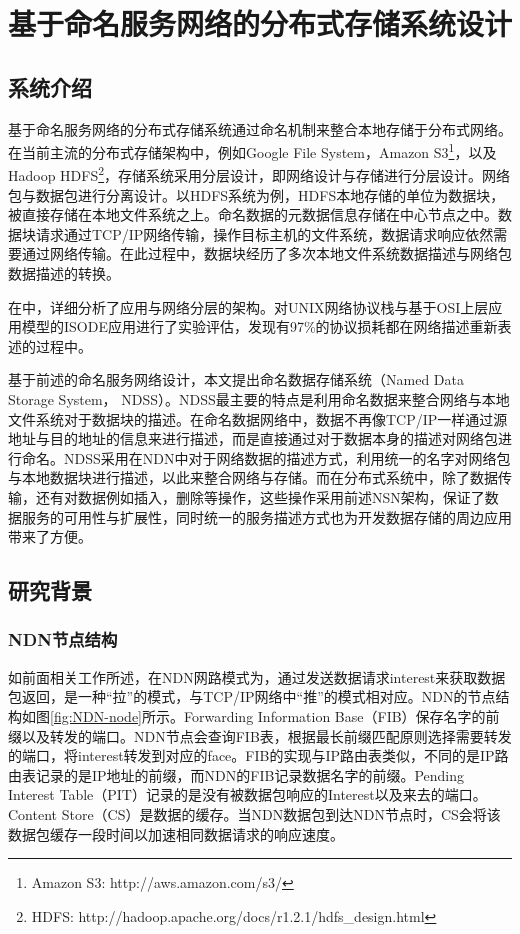 

\chapter{基于命名服务网络的分布式存储系统设计}

\section{系统介绍}
基于命名服务网络的分布式存储系统通过命名机制来整合本地存储于分布式网络。在当前主流的分布式存储架构中，例如Google File System\cite{ghemawat2003google}，Amazon S3\footnote{Amazon S3: http://aws.amazon.com/s3/}，以及Hadoop HDFS\footnote{HDFS: http://hadoop.apache.org/docs/r1.2.1/hdfs\_design.html }，存储系统采用分层设计，即网络设计与存储进行分层设计。网络包与数据包进行分离设计。以HDFS系统为例，HDFS本地存储的单位为数据块，被直接存储在本地文件系统之上。命名数据的元数据信息存储在中心节点之中。数据块请求通过TCP/IP网络传输，操作目标主机的文件系统，数据请求响应依然需要通过网络传输。在此过程中，数据块经历了多次本地文件系统数据描述与网络包数据描述的转换。

在\cite{clark1990architectural}中，详细分析了应用与网络分层的架构。对UNIX网络协议栈与基于OSI上层应用模型的ISODE应用进行了实验评估，发现有97\%的协议损耗都在网络描述重新表述的过程中。

基于前述的命名服务网络设计，本文提出命名数据存储系统（Named Data Storage System， NDSS）。NDSS最主要的特点是利用命名数据来整合网络与本地文件系统对于数据块的描述。在命名数据网络中，数据不再像TCP/IP一样通过源地址与目的地址的信息来进行描述，而是直接通过对于数据本身的描述对网络包进行命名。NDSS采用在NDN中对于网络数据的描述方式，利用统一的名字对网络包与本地数据块进行描述，以此来整合网络与存储。而在分布式系统中，除了数据传输，还有对数据例如插入，删除等操作，这些操作采用前述NSN架构，保证了数据服务的可用性与扩展性，同时统一的服务描述方式也为开发数据存储的周边应用带来了方便。

\section{研究背景}
\subsection{NDN节点结构}
如前面相关工作所述，在NDN网路模式为，通过发送数据请求interest来获取数据包返回，是一种“拉”的模式，与TCP/IP网络中“推”的模式相对应。NDN的节点结构如图\ref{fig:NDN-node}所示。Forwarding Information Base（FIB）保存名字的前缀以及转发的端口。NDN节点会查询FIB表，根据最长前缀匹配原则选择需要转发的端口，将interest转发到对应的face。FIB的实现与IP路由表类似，不同的是IP路由表记录的是IP地址的前缀，而NDN的FIB记录数据名字的前缀。Pending Interest Table（PIT）记录的是没有被数据包响应的Interest以及来去的端口。Content Store（CS）是数据的缓存。当NDN数据包到达NDN节点时，CS会将该数据包缓存一段时间以加速相同数据请求的响应速度。

